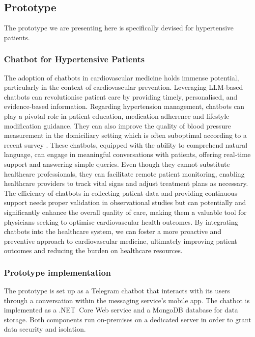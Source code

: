 \documentclass[preprint,12pt]{elsarticle}
\newcommand{\stefano}[1]{{\color{blue}{\textbf{[Stefano]}~#1}}}
\begin{document}
\subsection{Prototype}\label{subsec:proto}

The prototype we are presenting here is specifically devised for hypertensive patients.
\subsubsection{Chatbot for Hypertensive Patients}

The adoption of chatbots in cardiovascular medicine holds immense potential, particularly in the context of cardiovascular prevention. 
%
Leveraging LLM-based chatbots can revolutionise patient care by providing timely, personalised, and evidence-based information. 
%
Regarding hypertension management, chatbots can play a pivotal role in patient education, medication adherence and lifestyle modification guidance. 
%
They can also improve the quality of blood pressure measurement in the domiciliary setting which is often suboptimal according to a recent survey \cite{Mancusi2022}.
%
These chatbots, equipped with the ability to comprehend natural language, can engage in meaningful conversations with patients, offering real-time support and answering simple queries. 
%
Even though they cannot substitute healthcare professionals, they can facilitate remote patient monitoring, enabling healthcare providers to track vital signs and adjust treatment plans as necessary. 
%
The efficiency of chatbots in collecting patient data and providing continuous support needs proper validation in observational studies but can potentially and significantly enhance the overall quality of care, making them a valuable tool for physicians seeking to optimise cardiovascular health outcomes. 
%
By integrating chatbots into the healthcare system, we can foster a more proactive and preventive approach to cardiovascular medicine, ultimately improving patient outcomes and reducing the burden on healthcare resources.

\subsubsection{Prototype implementation}
%
The prototype is set up as a Telegram chatbot that interacts with its users through a conversation within the messaging service's mobile app.
%
The chatbot is implemented as a .NET~Core Web service and a MongoDB database for data storage.
Both components run on-premises on a dedicated server in order to grant data security and isolation.
\end{document}
